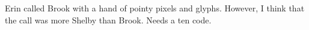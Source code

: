 

Erin called Brook with a hand of pointy pixels and glyphs.  However, I
think that the call was more Shelby than Brook.  Needs a ten code.

\bye
